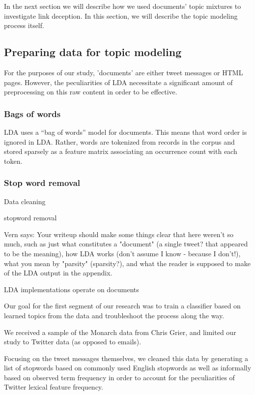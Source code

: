 \documentclass[times, 11pt, twocolumn]{article}
\begin{document}
In the next section we will describe how we used documents' topic mixtures to investigate link deception.
In this section, we will describe the topic modeling process itself.


\subsection{Preparing data for topic modeling}

For the purposes of our study, 'documents' are either tweet messages or HTML pages.
However, the peculiarities of LDA necessitate a significant amount of preprocessing on this raw content in order to be effective.

\subsubsection{Bags of words}

LDA uses a ``bag of words'' model for documents.
This means that word order is ignored in LDA.
Rather, words are tokenized from records in the corpus and stored sparsely as a feature matrix associating an occurrence count with each token.

\subsubsection{Stop word removal}




Data cleaning 

stopword removal



Vern says: Your writeup should make some things clear that here weren't so much, such as just what constitutes a "document" (a single tweet? that appeared to be the meaning), how LDA works (don't assume I know - because I don't!), what you mean by "parsity" (sparsity?), and what the reader is supposed to make of the      LDA output in the appendix.

LDA implementations operate on documents


Our  goal for the first segment of our research was to train a classifier  based on learned topics from the data and troubleshoot the process along  the way.

We received a sample of the Monarch data from Chris Grier, and limited our study to Twitter data (as opposed to emails).  

Focusing on the tweet messages themselves, we cleaned this data by generating a list of stopwords based on commonly used English stopwords as well as informally based on observed term frequency in order to account for the peculiarities of Twitter lexical feature frequency.
\end{document}
